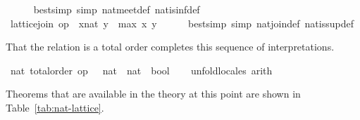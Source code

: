 \begin{isabellebody}
\ \ \ \ \isamarkupfalse%
\ {\isacharparenleft}bestsimp\ simp{\isacharcolon}\ nat{\isachardot}meet{\isacharunderscore}def\ nat{\isachardot}is{\isacharunderscore}inf{\isacharunderscore}def{\isacharparenright}\isanewline
\ \ \isamarkupfalse%
\ {\isachardoublequoteopen}lattice{\isachardot}join\ op\ {\isasymle}\ {\isacharparenleft}x{\isacharcolon}{\isacharcolon}nat{\isacharparenright}\ y\ {\isacharequal}\ max\ x\ y{\isachardoublequoteclose}\isanewline
\ \ \ \ \isamarkupfalse%
\ {\isacharparenleft}bestsimp\ simp{\isacharcolon}\ nat{\isachardot}join{\isacharunderscore}def\ nat{\isachardot}is{\isacharunderscore}sup{\isacharunderscore}def{\isacharparenright}\isanewline
{}\isamarkupfalse%
%
\endisatagvisible
{\isafoldvisible}%
%
\isadelimvisible
%
\endisadelimvisible
%
\begin{isamarkuptext}%
That the relation \isa{{\isasymle}} is a total order completes this
  sequence of interpretations.%
\end{isamarkuptext}%
\isamarkuptrue%
%
\isadelimvisible
%
\endisadelimvisible
%
\isatagvisible
{}\isamarkupfalse%
\ nat{\isacharcolon}\ total{\isacharunderscore}order\ {\isachardoublequoteopen}op\ {\isasymle}\ {\isacharcolon}{\isacharcolon}\ nat\ {\isasymRightarrow}\ nat\ {\isasymRightarrow}\ bool{\isachardoublequoteclose}\isanewline
\ \ \isamarkupfalse%
\ unfold{\isacharunderscore}locales\ arith%
\endisatagvisible
{\isafoldvisible}%
%
\isadelimvisible
%
\endisadelimvisible
%
\begin{isamarkuptext}%
Theorems that are available in the theory at this point are shown in
  Table~\ref{tab:nat-lattice}.


\end{isamarkuptext}
\end{isabellebody}
